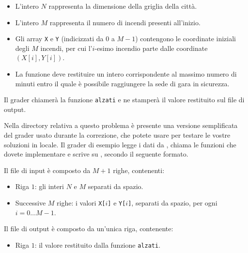 \begin{itemize}[nolistsep]
  \item L'intero $N$ rappresenta la dimensione della griglia della città.
  \item L'intero $M$ rappresenta il numero di incendi presenti all'inizio.
  \item Gli array \texttt{X} e \texttt{Y} (indicizzati da $0$ a $M-1$)
  	    contengono le coordinate iniziali degli $M$ incendi, per cui
  	    l'$i$-esimo incendio parte dalle coordinate $(X[i], Y[i])$.
  \item La funzione deve restituire un intero corrispondente al massimo
  		numero di minuti entro il quale è possibile raggiungere la sede di
  		gara in sicurezza.
\end{itemize}

\medskip

Il grader chiamerà la funzione \texttt{alzati} e ne stamperà il valore
restituito sul file di output.



\Grader

Nella directory relativa a questo problema è presente una versione semplificata
del grader usato durante la correzione, che potete usare per testare le vostre
soluzioni in locale. Il grader di esempio legge i dati da , chiama
le funzioni che dovete implementare e scrive su \outputfile{}, secondo il
seguente formato.

Il file di input è composto da $M+1$ righe, contenenti:
\begin{itemize}[nolistsep,itemsep=2mm]
\item Riga $1$: gli interi $N$ e $M$ separati da spazio.
\item Successive $M$ righe: i valori \texttt{X[$i$]} e \texttt{Y[$i$]}, separati
da spazio, per ogni $i = 0\ldots M-1$.
\end{itemize}

Il file di output è composto da un'unica riga, contenente:
\begin{itemize}[nolistsep,itemsep=2mm]
\item Riga $1$: il valore restituito dalla funzione \texttt{alzati}.
\end{itemize}



